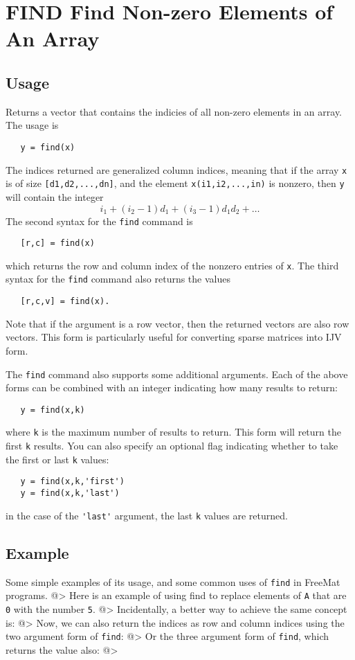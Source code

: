 \section{FIND Find Non-zero Elements of An Array}

\subsection{Usage}

Returns a vector that contains the indicies of all non-zero elements 
in an array.  The usage is
\begin{verbatim}
   y = find(x)
\end{verbatim}
The indices returned are generalized column indices, meaning that if 
the array \verb|x| is of size \verb|[d1,d2,...,dn]|, and the
element \verb|x(i1,i2,...,in)| is nonzero, then \verb|y|
will contain the integer
\[
   i_1 + (i_2-1) d_1 + (i_3-1) d_1 d_2 + \dots
\]
The second syntax for the \verb|find| command is
\begin{verbatim}
   [r,c] = find(x)
\end{verbatim}
which returns the row and column index of the nonzero entries of \verb|x|.
The third syntax for the \verb|find| command also returns the values
\begin{verbatim}
   [r,c,v] = find(x).
\end{verbatim}
Note that if the argument is a row vector, then the returned vectors
are also row vectors. This form is particularly useful for converting 
sparse matrices into IJV form.

The \verb|find| command also supports some additional arguments.  Each of the
above forms can be combined with an integer indicating how many results
to return:
\begin{verbatim}
   y = find(x,k)
\end{verbatim}
where \verb|k| is the maximum number of results to return.  This form will return
the first \verb|k| results.  You can also specify an optional flag indicating 
whether to take the first or last \verb|k| values:
\begin{verbatim}
   y = find(x,k,'first')
   y = find(x,k,'last')
\end{verbatim}
in the case of the \verb|'last'| argument, the last \verb|k| values are returned.
\subsection{Example}

Some simple examples of its usage, and some common uses of \verb|find| in FreeMat programs.
@>
Here is an example of using find to replace elements of \verb|A| that are \verb|0| with the number \verb|5|.
@>
Incidentally, a better way to achieve the same concept is:
@>
Now, we can also return the indices as row and column indices using the two argument
form of \verb|find|:
@>
Or the three argument form of \verb|find|, which returns the value also:
@>
